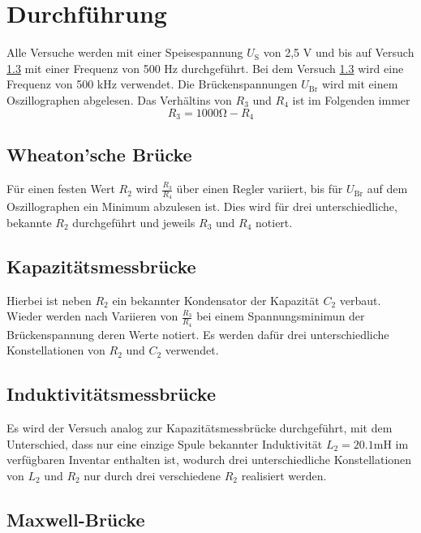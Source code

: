 \section{Durchführung}
\label{sec:Durchführung}

Alle Versuche werden mit einer Speisespannung $U_{\text{S}}$ von 2,5 \si{\volt} und bis auf Versuch \ref{sec:Induktivitätsmessbrücke} mit einer Frequenz von 500 \si{\hertz}
durchgeführt. Bei dem Versuch \ref{sec:Induktivitätsmessbrücke} wird eine Frequenz von 500 \si{\kilo\hertz} verwendet. Die Brückenspannungen $U_{\text{Br}}$ wird mit einem Oszillographen abgelesen. Das Verhältins von 
$R_3$ und $R_4$ ist im Folgenden immer \begin{equation}
    R_3 = 1000\si{\ohm} - R_4
\end{equation}

\subsection{Wheaton'sche Brücke}

Für einen festen Wert $R_2$ wird $\frac{R_3}{R_4}$ über einen Regler variiert, bis für $U_{\text{Br}}$ auf dem 
Oszillographen ein Minimum abzulesen ist. Dies wird für drei unterschiedliche, bekannte $R_2$ 
durchgeführt und jeweils $R_3$ und $R_4$ notiert. 

\subsection{Kapazitätsmessbrücke}

Hierbei ist neben $R_2$ ein bekannter Kondensator der Kapazität $C_2$ verbaut. 
Wieder werden nach Variieren von $\frac{R_3}{R_4}$ bei einem Spannungsminimun der
Brückenspannung deren Werte notiert. Es werden dafür drei unterschiedliche Konstellationen
von $R_2$ und $C_2$ verwendet. 

\subsection{Induktivitätsmessbrücke}
\label{sec:Induktivitätsmessbrücke}
Es wird der Versuch analog zur Kapazitätsmessbrücke durchgeführt, mit dem Unterschied, 
dass nur eine einzige Spule bekannter Induktivität $L_2=20.1\si{\milli\henry}$ im verfügbaren Inventar enthalten ist,
wodurch drei unterschiedliche Konstellationen von $L_2$ und $R_2$ nur durch drei verschiedene 
$R_2$ realisiert werden.

\subsection{Maxwell-Brücke}


